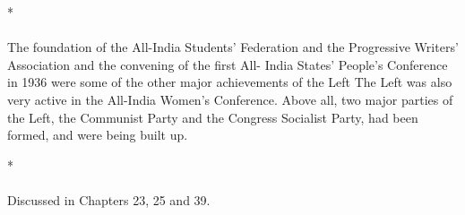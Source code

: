\begin{center}*\end{center}

\paragraph*{}
The foundation of the All-India Students' Federation and the Progressive Writers' Association and the convening of the first All- India States' People's Conference in 1936 were some of the other major achievements of the Left The Left was also very active in the All-India Women's Conference. Above all, two major parties of the Left, the Communist Party and the Congress Socialist Party, had been formed, and were being built up.

\begin{center}*\end{center}

\paragraph*{}
Discussed in Chapters 23, 25 and 39.
